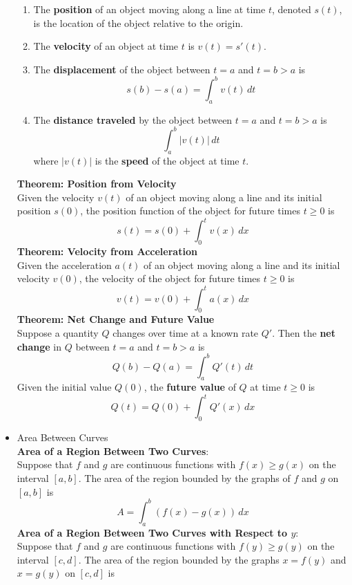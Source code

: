 \documentclass{article}
\begin{document}
\begin{itemize}
\begin{enumerate}
            \item The \textbf{position} of an object moving along a line at time $t$, denoted $s(t)$, is the location of the object relative to the origin.
            \item The \textbf{velocity} of an object at time $t$ is $v(t) = s'(t)$.
            \item The \textbf{displacement} of the object between $t = a$ and $t = b > a$ is
                $$s(b) - s(a) = \int_a^b{v(t)\,dt}$$
            \item The \textbf{distance traveled} by the object between $t = a$ and $t = b > a$ is
                $$\int_a^b{\left|v(t)\right|\,dt}$$
                where $|v(t)|$ is the \textbf{speed} of the object at time $t$.
        \end{enumerate}
        \textbf{Theorem: Position from Velocity} \\
        Given the velocity $v(t)$ of an object moving along a line and its initial position $s(0)$, the position function of the object for future times $t \geq 0$ is
        $$s(t) = s(0) + \int_0^t{v(x)\,dx}$$
        \textbf{Theorem: Velocity from Acceleration} \\
        Given the acceleration $a(t)$ of an object moving along a line and its initial velocity $v(0)$, the velocity of the object for future times $t \geq 0$ is
        $$v(t) = v(0) + \int_0^t{a(x)\,dx}$$
        \textbf{Theorem: Net Change and Future Value} \\
        Suppose a quantity $Q$ changes over time at a known rate $Q'$. Then the \textbf{net change} in $Q$ between $t = a$ and $t = b > a$ is
        $$Q(b) - Q(a) = \int_a^b{Q'(t)\,dt}$$
        Given the initial value $Q(0)$, the \textbf{future value} of $Q$ at time $t \geq 0$ is
        $$Q(t) = Q(0) + \int_0^t{Q'(x)\,dx}$$
    \item Area Between Curves \\
        \textbf{Area of a Region Between Two Curves}: \\
        Suppose that $f$ and $g$ are continuous functions with $f(x) \geq g(x)$ on the interval $[a,b]$. The area of the region bounded by the graphs of $f$ and $g$ on $[a,b]$ is
        $$A = \int_a^b{\left(f(x) - g(x)\right)\,dx}$$
        \textbf{Area of a Region Between Two Curves with Respect to $y$}: \\
        Suppose that $f$ and $g$ are continuous functions with $f(y) \geq g(y)$ on the interval $[c,d]$. The area of the region bounded by the graphs $x = f(y)$ and $x = g(y)$ on $[c,d]$ is

\end{itemize}
\end{document}
